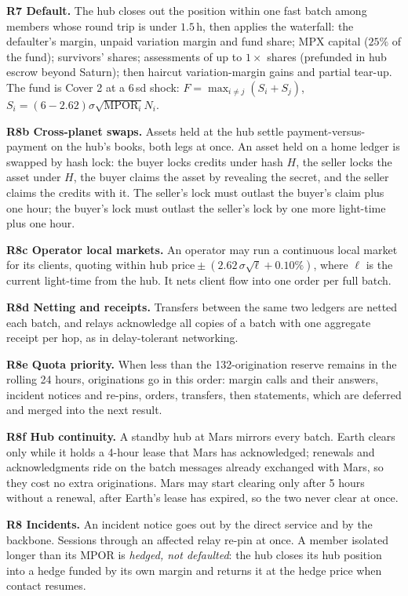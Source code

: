 \documentclass[11pt]{article}
\theoremstyle{definition}
\theoremstyle{remark}
\newcommand{\h}{\,\mathrm{h}}
\begin{document}
\textbf{R7 Default.} The hub closes out the position within one fast batch among members whose round trip is under $1.5\h$, then applies the waterfall: the defaulter's margin, unpaid variation margin and fund share; MPX capital ($25\%$ of the fund); survivors' shares; assessments of up to $1\times$ shares (prefunded in hub escrow beyond Saturn); then haircut variation-margin gains and partial tear-up. The fund is Cover 2 \cite{pfmi} at a $6\,$sd shock: $F=\max_{i\ne j}(S_i+S_j)$, $S_i=(6-2.62)\sigma\sqrt{\mathrm{MPOR}_i}N_i$.

\textbf{R8b Cross-planet swaps.} Assets held at the hub settle payment-versus-payment on the hub's books, both legs at once. An asset held on a home ledger is swapped by hash lock: the buyer locks credits under hash $H$, the seller locks the asset under $H$, the buyer claims the asset by revealing the secret, and the seller claims the credits with it. The seller's lock must outlast the buyer's claim plus one hour; the buyer's lock must outlast the seller's lock by one more light-time plus one hour.

\textbf{R8c Operator local markets.} An operator may run a continuous local market for its clients, quoting within $\text{hub price}\pm(2.62\,\sigma\sqrt{\ell}+0.10\%)$, where $\ell$ is the current light-time from the hub. It nets client flow into one order per full batch.

\textbf{R8d Netting and receipts.} Transfers between the same two ledgers are netted each batch, and relays acknowledge all copies of a batch with one aggregate receipt per hop, as in delay-tolerant networking.

\textbf{R8e Quota priority.} When less than the 132-origination reserve remains in the rolling 24 hours, originations go in this order: margin calls and their answers, incident notices and re-pins, orders, transfers, then statements, which are deferred and merged into the next result.

\textbf{R8f Hub continuity.} A standby hub at Mars mirrors every batch. Earth clears only while it holds a 4-hour lease that Mars has acknowledged; renewals and acknowledgments ride on the batch messages already exchanged with Mars, so they cost no extra originations. Mars may start clearing only after 5 hours without a renewal, after Earth's lease has expired, so the two never clear at once.

\textbf{R8 Incidents.} An incident notice goes out by the direct service and by the backbone. Sessions through an affected relay re-pin at once. A member isolated longer than its MPOR is \emph{hedged, not defaulted}: the hub closes its hub position into a hedge funded by its own margin and returns it at the hedge price when contact resumes.
\end{document}
